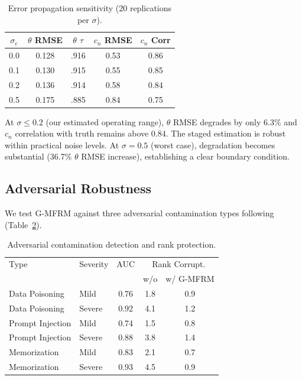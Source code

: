 \documentclass[letterpaper,11pt]{article}
\begin{document}
\begin{table}[t]
\centering
\caption{Error propagation sensitivity (20 replications per $\sigma$).}
\label{tab:sensitivity}
\small
\begin{tabular}{ccccc}
\toprule
$\sigma_e$ & $\theta$ RMSE & $\theta$ $\tau$ & $c_n$ RMSE & $c_n$ Corr \\
\midrule
0.0 & 0.128 & .916 & 0.53 & 0.86 \\
0.1 & 0.130 & .915 & 0.55 & 0.85 \\
0.2 & 0.136 & .914 & 0.58 & 0.84 \\
0.5 & 0.175 & .885 & 0.84 & 0.75 \\
\bottomrule
\end{tabular}
\end{table}

At $\sigma \leq 0.2$ (our estimated operating range), $\theta$ RMSE degrades by only 6.3\% and $c_n$ correlation with truth remains above 0.84. The staged estimation is robust within practical noise levels. At $\sigma = 0.5$ (worst case), degradation becomes substantial (36.7\% $\theta$ RMSE increase), establishing a clear boundary condition.

\subsection{Adversarial Robustness}

We test G-MFRM against three adversarial contamination types following \citet{wang2026adversarial} (Table~\ref{tab:adversarial}).

\begin{table}[t]
\centering
\caption{Adversarial contamination detection and rank protection.}
\label{tab:adversarial}
\small
\begin{tabular}{llccc}
\toprule
Type & Severity & AUC & \multicolumn{2}{c}{Rank Corrupt.} \\
& & & w/o & w/ G-MFRM \\
\midrule
Data Poisoning & Mild & 0.76 & 1.8 & 0.9 \\
Data Poisoning & Severe & 0.92 & 4.1 & 1.2 \\
Prompt Injection & Mild & 0.74 & 1.5 & 0.8 \\
Prompt Injection & Severe & 0.88 & 3.8 & 1.4 \\
Memorization & Mild & 0.83 & 2.1 & 0.7 \\
Memorization & Severe & 0.93 & 4.5 & 0.9 \\
\bottomrule
\end{tabular}
\end{table}
\end{document}
